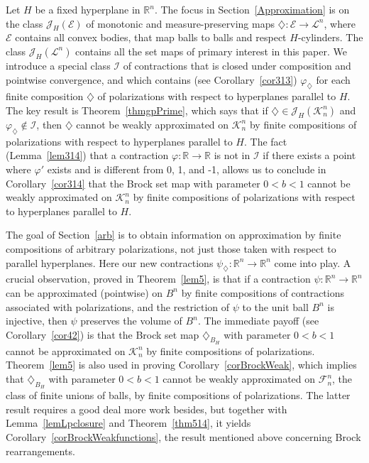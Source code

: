 \documentclass[12pt,reqno]{amsart}
\newcommand{\R}{{\mathbb R}}
\newcommand{\cI}{\mathcal I}
\newcommand{\cK}{\mathcal K}
\newcommand{\cL}{\mathcal L}
\newcommand{\cF}{\mathcal F}
\newcommand{\cJ}{\mathcal J}
\newcommand{\cE}{{\mathcal E}}
\newcommand{\di}{\diamondsuit}
\numberwithin{equation}{section}
\begin{document}
Let $H$ be a fixed hyperplane in $\R^n$.  The focus in Section~\ref{Approximation} is on the class $\cJ_H(\cE)$ of
monotonic and measure-preserving maps $\di:\cE\to\cL^n$, where $\cE$ contains all convex bodies, that map balls to balls and respect $H$-cylinders.  The class $\cJ_H({\cL}^n)$ contains all the set maps of primary interest in this paper.  We introduce a special class $\cI$ of contractions that is closed under composition and pointwise convergence, and which contains (see Corollary~\ref{cor313}) $\varphi_{\di}$ for each finite composition $\di$ of polarizations with respect to hyperplanes parallel to $H$.  The key result is Theorem~\ref{thmgpPrime}, which says that if  $\di\in \cJ_H(\cK_n^n)$ and $\varphi_{\di}\not\in \cI$, then $\di$ cannot be weakly approximated on ${\cK}^n_n$ by finite compositions of polarizations with respect to hyperplanes parallel to $H$.  The fact (Lemma~\ref{lem314}) that a contraction $\varphi:\R\to\R$ is not in $\cI$ if there exists a point where $\varphi'$ exists and is different from 0, 1, and -1, allows us to conclude in Corollary~\ref{cor314} that the Brock set map with parameter $0<b<1$ cannot be weakly approximated on ${\cK}^n_n$ by finite compositions of polarizations with respect to hyperplanes parallel to $H$.

The goal of Section~\ref{arb} is to obtain information on approximation by finite compositions of arbitrary polarizations, not just those taken with respect to parallel hyperplanes.  Here our new contractions $\psi_{\di}:\R^n\to\R^n$ come into play.  A crucial observation, proved in Theorem~\ref{lem5}, is that if a contraction $\psi:\R^n\to\R^n$ can be approximated (pointwise) on $B^n$ by finite compositions of contractions associated with polarizations, and the restriction of $\psi$ to the unit ball $B^n$ is injective, then $\psi$ preserves the volume of $B^n$.  The immediate payoff (see Corollary~\ref{cor42}) is that the Brock set map $\di_{B_H}$ with parameter $0<b<1$ cannot be approximated on ${\cK}^n_n$ by finite compositions of polarizations. Theorem~\ref{lem5} is also used in proving Corollary~\ref{corBrockWeak}, which implies that $\di_{B_H}$ with parameter $0<b<1$ cannot be weakly approximated on ${\cF}_n^n$, the class of finite unions of balls, by finite compositions of polarizations.  The latter result requires a good deal more work besides, but together with Lemma~\ref{lemLpclosure} and Theorem~\ref{thm514}, it yields Corollary~\ref{corBrockWeakfunctions}, the result mentioned above concerning Brock rearrangements.
\end{document}
